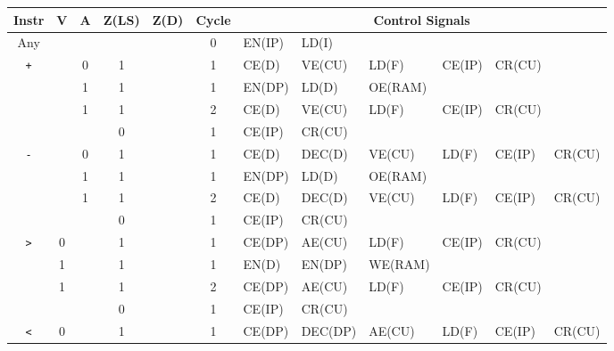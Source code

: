 \begin{landscape}
  \begin{longtable}[c] {c|cccc|c|llllll}
                     Instr       & V & A & Z(LS) & Z(D) & Cycle & \multicolumn{6}{c}{Control Signals}                   \\ \hline
    \rowcolor{White} Any         &   &   &       &      & 0     & EN(IP) & LD(I)   &         &        &       &         \\ \hline
    \rowcolor{Gray}  \texttt{+}  &   & 0 & 1     &      & 1     & CE(D)  & VE(CU)  & LD(F)   & CE(IP) & CR(CU) &        \\
    \rowcolor{White}             &   & 1 & 1     &      & 1     & EN(DP) & LD(D)   & OE(RAM) &        &        &        \\
    \rowcolor{White}             &   & 1 & 1     &      & 2     & CE(D)  & VE(CU)  & LD(F)   & CE(IP) & CR(CU) &        \\
    \rowcolor{Gray}              &   &   & 0     &      & 1     & CE(IP) & CR(CU)  &         &        &        &        \\ \hline
    \rowcolor{White} \texttt{-}  &   & 0 & 1     &      & 1     & CE(D)  & DEC(D)  & VE(CU)  & LD(F)  & CE(IP) & CR(CU) \\
    \rowcolor{Gray}              &   & 1 & 1     &      & 1     & EN(DP) & LD(D)   & OE(RAM) &        &        &        \\
    \rowcolor{Gray}              &   & 1 & 1     &      & 2     & CE(D)  & DEC(D)  & VE(CU)  & LD(F)  & CE(IP) & CR(CU) \\
    \rowcolor{White}             &   &   & 0     &      & 1     & CE(IP) & CR(CU)  &         &        &        &        \\ \hline
    \rowcolor{Gray}  \texttt{>}  & 0 &   & 1     &      & 1     & CE(DP) & AE(CU)  & LD(F)   & CE(IP) & CR(CU) &        \\
    \rowcolor{White}             & 1 &   & 1     &      & 1     & EN(D)  & EN(DP)  & WE(RAM) &        &        &        \\
    \rowcolor{White}             & 1 &   & 1     &      & 2     & CE(DP) & AE(CU)  & LD(F)   & CE(IP) & CR(CU) &        \\
    \rowcolor{Gray}              &   &   & 0     &      & 1     & CE(IP) & CR(CU)  &         &        &        &        \\ \hline
    \rowcolor{White} \texttt{<}  & 0 &   & 1     &      & 1     & CE(DP) & DEC(DP) & AE(CU)  & LD(F)  & CE(IP) & CR(CU) \\

\end{longtable}
\end{landscape}
